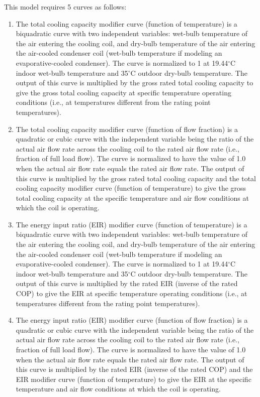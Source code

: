 This model requires 5 curves as follows:

\begin{enumerate}
\def\labelenumi{\arabic{enumi}.}
\item
  The total cooling capacity modifier curve (function of temperature) is a biquadratic curve with two independent variables: wet-bulb temperature of the air entering the cooling coil, and dry-bulb temperature of the air entering the air-cooled condenser coil (wet-bulb temperature if modeling an evaporative-cooled condenser). The curve is normalized to 1 at 19.44$^\circ$C indoor wet-bulb temperature and 35$^\circ$C outdoor dry-bulb temperature. The output of this curve is multiplied by the gross rated total cooling capacity to give the gross total cooling capacity at specific temperature operating conditions (i.e., at temperatures different from the rating point temperatures).
\item
  The total cooling capacity modifier curve (function of flow fraction) is a quadratic or cubic curve with the independent variable being the ratio of the actual air flow rate across the cooling coil to the rated air flow rate (i.e., fraction of full load flow). The curve is normalized to have the value of 1.0 when the actual air flow rate equals the rated air flow rate. The output of this curve is multiplied by the gross rated total cooling capacity and the total cooling capacity modifier curve (function of temperature) to give the gross total cooling capacity at the specific temperature and air flow conditions at which the coil is operating.
\item
  The energy input ratio (EIR) modifier curve (function of temperature) is a biquadratic curve with two independent variables: wet-bulb temperature of the air entering the cooling coil, and dry-bulb temperature of the air entering the air-cooled condenser coil (wet-bulb temperature if modeling an evaporative-cooled condenser). The curve is normalized to 1 at 19.44$^\circ$C indoor wet-bulb temperature and 35$^\circ$C outdoor dry-bulb temperature. The output of this curve is multiplied by the rated EIR (inverse of the rated COP) to give the EIR at specific temperature operating conditions (i.e., at temperatures different from the rating point temperatures).
\item
  The energy input ratio (EIR) modifier curve (function of flow fraction) is a quadratic or cubic curve with the independent variable being the ratio of the actual air flow rate across the cooling coil to the rated air flow rate (i.e., fraction of full load flow). The curve is normalized to have the value of 1.0 when the actual air flow rate equals the rated air flow rate. The output of this curve is multiplied by the rated EIR (inverse of the rated COP) and the EIR modifier curve (function of temperature) to give the EIR at the specific temperature and air flow conditions at which the coil is operating.

\end{enumerate}
